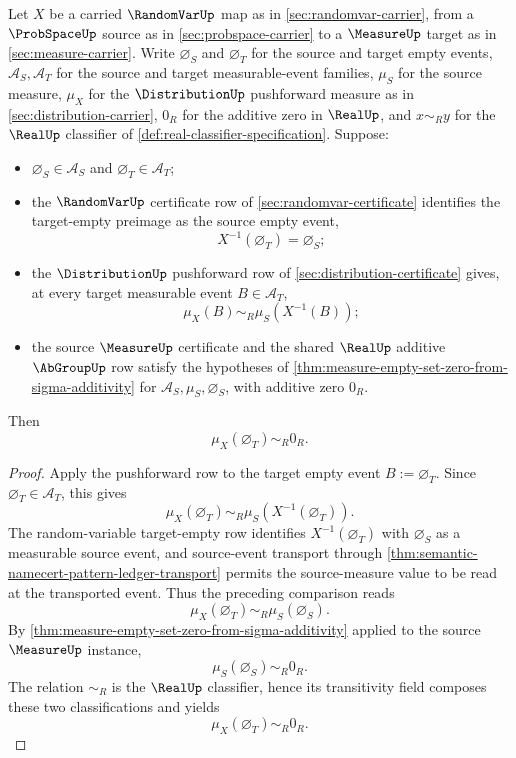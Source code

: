 \begin{theorem}
\label{thm:distribution-empty-target-event-zero-mass}
Let $X$ be a carried $\RandomVarUp$ map as in \autoref{sec:randomvar-carrier}, from a $\ProbSpaceUp$ source as in \autoref{sec:probspace-carrier} to a $\MeasureUp$ target as in \autoref{sec:measure-carrier}. Write $\varnothing_S$ and $\varnothing_T$ for the source and target empty events, $\mathcal{A}_S,\mathcal{A}_T$ for the source and target measurable-event families, $\mu_S$ for the source measure, $\mu_X$ for the $\DistributionUp$ pushforward measure as in \autoref{sec:distribution-carrier}, $0_R$ for the additive zero in $\RealUp$, and $x\sim_R y$ for the $\RealUp$ classifier of \autoref{def:real-classifier-specification}. Suppose:
\begin{itemize}
\item $\varnothing_S\in\mathcal{A}_S$ and $\varnothing_T\in\mathcal{A}_T$;
\item the $\RandomVarUp$ certificate row of \autoref{sec:randomvar-certificate} identifies the target-empty preimage as the source empty event,
$$
X^{-1}(\varnothing_T)=\varnothing_S;
$$
\item the $\DistributionUp$ pushforward row of \autoref{sec:distribution-certificate} gives, at every target measurable event $B\in\mathcal{A}_T$,
$$
\mu_X(B)\sim_R\mu_S(X^{-1}(B));
$$
\item the source $\MeasureUp$ certificate and the shared $\RealUp$ additive $\AbGroupUp$ row satisfy the hypotheses of \autoref{thm:measure-empty-set-zero-from-sigma-additivity} for $\mathcal{A}_S,\mu_S,\varnothing_S$, with additive zero $0_R$.
\end{itemize}
Then
$$
\mu_X(\varnothing_T)\sim_R0_R.
$$
\end{theorem}
\begin{proof}
Apply the pushforward row to the target empty event $B:=\varnothing_T$. Since $\varnothing_T\in\mathcal{A}_T$, this gives
$$
\mu_X(\varnothing_T)\sim_R\mu_S(X^{-1}(\varnothing_T)).
$$
The random-variable target-empty row identifies $X^{-1}(\varnothing_T)$ with $\varnothing_S$ as a measurable source event, and source-event transport through \autoref{thm:semantic-namecert-pattern-ledger-transport} permits the source-measure value to be read at the transported event. Thus the preceding comparison reads
$$
\mu_X(\varnothing_T)\sim_R\mu_S(\varnothing_S).
$$
By \autoref{thm:measure-empty-set-zero-from-sigma-additivity} applied to the source $\MeasureUp$ instance,
$$
\mu_S(\varnothing_S)\sim_R0_R.
$$
The relation $\sim_R$ is the $\RealUp$ classifier, hence its transitivity field composes these two classifications and yields
$$
\mu_X(\varnothing_T)\sim_R0_R.
$$
\end{proof}

